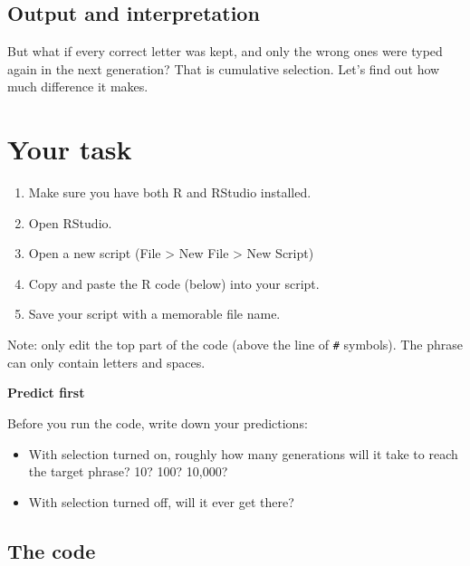 \documentclass[
  a4paper]{book}
\providecommand{\tightlist}{%
  \setlength{\itemsep}{0pt}\setlength{\parskip}{0pt}}
\begin{document}
\subsection{Output and interpretation}\label{output-and-interpretation}

But what if every correct letter was kept, and only the wrong ones were typed again in the next generation? That is cumulative selection. Let's find out how much difference it makes.

\section{Your task}\label{your-task}

\begin{enumerate}
\def\labelenumi{\arabic{enumi}.}
\setcounter{enumi}{-1}
\tightlist
\item
  Make sure you have both R and RStudio installed.
\item
  Open RStudio.
\item
  Open a new script (File \textgreater{} New File \textgreater{} New Script)
\item
  Copy and paste the R code (below) into your script.
\item
  Save your script with a memorable file name.
\end{enumerate}

Note: only edit the top part of the code (above the line of \texttt{\#} symbols). The phrase can only contain letters and spaces.

\textbf{Predict first}

Before you run the code, write down your predictions:

\begin{itemize}
\tightlist
\item
  With selection turned on, roughly how many generations will it take to reach the target phrase? 10? 100? 10,000?
\item
  With selection turned off, will it ever get there?
\end{itemize}

\subsection{The code}\label{the-code}
\end{document}
